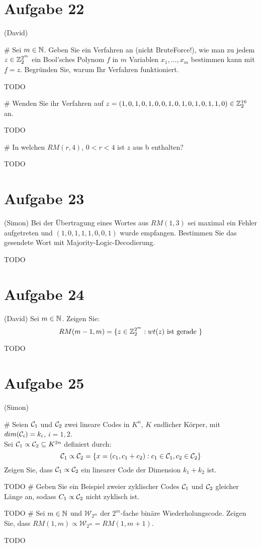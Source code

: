 
\setcounter{MaxMatrixCols}{20}

\section*{Aufgabe 22}
(David)
\begin{myList}
#
Sei $m \in \mathbb{N}$. Geben Sie ein Verfahren an (nicht BruteForce!), wie man zu jedem $z \in \mathbb{Z}^{2^m}_2$ ein Bool'sches Polynom $f$ in $m$ Variablen $x_1,\ldots,x_m$ bestimmen kann mit $\underline{f} = z$. Begründen Sie, warum Ihr Verfahren funktioniert.\medskip

TODO

#
Wenden Sie ihr Verfahren auf $z = (1,0,1,0,1,0,0,1,0,1,0,1,0,1,1,0) \in \mathbb{Z}^{16}_{2}$ an.\medskip

TODO

#
In welchen $RM(r,4)$, $0 < r < 4$ ist $z$ aus b enthalten?\medskip

TODO
\end{myList}

\section*{Aufgabe 23}
(Simon)
Bei der Übertragung eines Wortes aus $RM(1,3)$ sei maximal ein Fehler aufgetreten und $(1,0,1,1,1,0,0,1)$ wurde empfangen. Bestimmen Sie das gesendete Wort mit Majority-Logic-Decodierung.\medskip

TODO

\section*{Aufgabe 24}
(David)
Sei $m \in \mathbb{N}$. Zeigen Sie:
\begin{equation*}
	RM(m-1,m) = \lbrace z \in \mathbb{Z}^{2^m}_2 : wt(z) \text{ ist gerade } \rbrace
\end{equation*}

TODO

\section*{Aufgabe 25}
(Simon)
\begin{myList}
#
Seien $\mathcal{C}_1$ und $\mathcal{C}_2$ zwei lineare Codes in $K^n$, $K$ endlicher Körper, mit $dim(\mathcal{C}_i) = k_i$, $i = 1,2$.\\
Sei $\mathcal{C}_1 \propto \mathcal{C}_2 \subseteq K^{2n}$ definiert durch:
\begin{equation*}
	\mathcal{C}_1 \propto \mathcal{C}_2 = \lbrace x = (c_1, c_1 + c_2) : c_1 \in \mathcal{C}_1, c_2 \in \mathcal{C}_2 \rbrace
\end{equation*}
Zeigen Sie, dass $\mathcal{C}_1 \propto \mathcal{C}_2$ ein linearer Code der Dimension $k_1 + k_2$ ist.\medskip

TODO
#
Geben Sie ein Beispiel zweier zyklischer Codes $\mathcal{C}_1$ und $\mathcal{C}_2$ gleicher Länge an, sodass $C_1 \propto \mathcal{C}_2$ nicht zyklisch ist.\medskip

TODO
#
Sei $m \in \mathbb{N}$ und $\mathcal{W}_{2^m}$ der $2^m$-fache binäre Wiederholungscode. Zeigen Sie, dass $RM(1,m) \propto \mathcal{W}_{2^m} = RM(1,m+1)$.\medskip

TODO
\end{myList}


